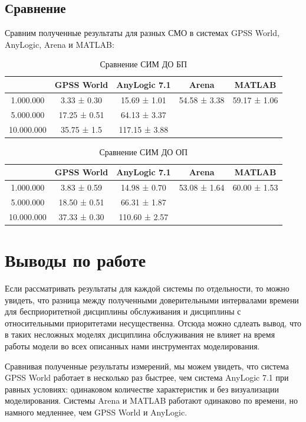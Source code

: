 \documentclass[a4paper,14pt]{report} %
\begin{document}
\section{Сравнение}
Сравним полученные результаты для разных СМО в системах GPSS World, AnyLogic, Arena и MATLAB: 

\begin{table}[h!]
\caption{Сравнение СИМ ДО БП}
\begin{tabular}{|c|c|c|c|c|}
\hline
 & GPSS World & AnyLogic 7.1  &  Arena & MATLAB\\
\hline
1.000.000 & 3.33 ± 0.30 & 15.69 ± 1.01 & 54.58 ± 3.38 & 59.17 ± 1.06\\
\hline
5.000.000 & 17.25 ± 0.51 & 64.13 ± 3.37 & & \\
\hline
10.000.000 & 35.75 ± 1.5 & 117.15 ± 3.88 & & \\
\hline
\end{tabular}
\end{table} 

\begin{table}[h!]
\caption{Сравнение СИМ ДО ОП}
\begin{tabular}{|c|c|c|c|c|}
\hline
 & GPSS World & AnyLogic 7.1 & Arena & MATLAB \\
\hline
1.000.000 & 3.83 ± 0.59 & 14.98 ± 0.70 & 53.08 ± 1.64 & 60.00  ± 1.53\\
\hline
5.000.000 & 18.50 ± 0.51 & 66.31 ± 1.87 &  & \\
\hline
10.000.000 & 37.33 ± 0.30 & 110.60 ± 2.57&   &\\
\hline
\end{tabular}
\end{table} 

\chapter{Выводы по работе}
Если рассматривать  результаты для каждой системы по отдельности, то можно увидеть, что разница между полученными доверительными интервалами времени для бесприоритетной дисциплины обслуживания и дисциплины с относительными приоритетами несущественна. Отсюда можно сдлеать вывод, что в таких несложных моделях дисциплина обслуживания не влияет на время работы модели во всех описанных нами инструментах моделирования.

Сравнивая полученные результаты измерений, мы можем увидеть, что система GPSS World работает в несколько раз быстрее, чем система AnyLogic 7.1 при равных условиях: одинаковом количестве характеристик и без визуализации моделирования. Системы Arena и MATLAB работают одинаково по времени, но намного медленнее, чем GPSS World и AnyLogic. 
\end{document}
